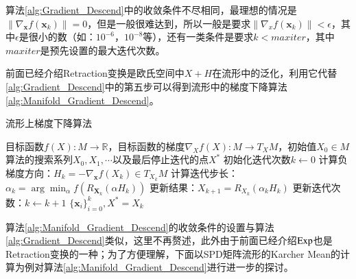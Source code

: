 算法\ref{alg:Gradient_Descend}中的收敛条件不尽相同，最理想的情况是$\|\nabla_{\bm{x}} f(\bm{x}_k)\|=0$，但是一般很难达到，所以一般是要求$\|\nabla_x f(\bm{x}_k)\|<\epsilon$，其中$\epsilon$是很小的数（如：$10^{-6}$，$10^{-8}$等），还有一类条件是要求$k<maxiter$，其中$maxiter$是预先设置的最大迭代次数。

前面已经介绍Retraction变换是欧氏空间中$X+H$在流形中的泛化，利用它代替\ref{alg:Gradient_Descend}中的第五步可以得到流形中的梯度下降算法\ref{alg:Manifold_Gradient_Descend}。
\begin{algorithm}[htb]
\caption{流形上梯度下降算法}
\label{alg:Manifold_Gradient_Descend}
\begin{algorithmic}[1]
\REQUIRE 目标函数$f(X):M\rightarrow \mathbb{R}$，目标函数的梯度$\nabla_X f(X):M \rightarrow T_{X}M$，初始值$X_0 \in M$
\ENSURE 算法的搜索系列$X_0,X_1,\cdots$以及最后停止迭代的点$X^{*}$
\STATE 初始化迭代次数$k \leftarrow 0$
\STATE 计算负梯度方向：$H_{k}=-\nabla_{\bm{x}}f(X_k) \in T_{X_k}M$
\STATE 计算迭代步长：$\alpha_{k}=\arg\min_{\alpha}f(R_{\bm{X}_{k}}(\alpha H_{k}))$
\STATE 更新结果：$X_{k+1}=R_{X_{k}}(\alpha_{k}H_{k})$
\STATE 更新迭代次数：$k\leftarrow k+1$
\ENDWHILE
\RETURN $\{\bm{x}_i\}_{i=0}^{k},X^{*}=X_{k}$
\end{algorithmic}
\end{algorithm}

算法\ref{alg:Manifold_Gradient_Descend}的收敛条件的设置与算法\ref{alg:Gradient_Descend}类似，这里不再赘述，此外由于前面已经介绍$\rm Exp$也是Retraction变换的一种；为了方便理解，下面以SPD矩阵流形的Karcher Mean的计算为例对算法\ref{alg:Manifold_Gradient_Descend}进行进一步的探讨。


